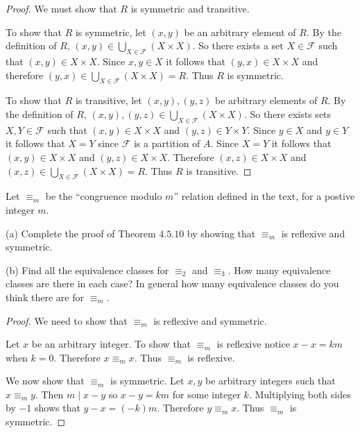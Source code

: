\begin{proof}
    We must show that $R$ is symmetric and transitive.

    To show that $R$ is symmetric, let $(x, y)$ be 
        an arbitrary element of $R$.
    By the definition of $R$, $(x, y) \in \bigcup_{X \in \mathcal{F}} (X \times X)$.
    So there exists a set $X \in \mathcal{F}$ such that $(x, y) \in X \times X$.
    Since $x, y \in X$ it follows that $(y, x) \in X \times X$ 
        and therefore $(y, x) \in \bigcup_{X \in \mathcal{F}} (X \times X) = R$.
    Thus $R$ is symmetric.

    To show that $R$ is transitive, let $(x, y), (y, z)$ be 
        arbitrary elements of $R$.
    By the definition of $R$, $(x, y), (y, z) \in \bigcup_{X \in \mathcal{F}} (X \times X)$.
    So there exists sets $X, Y \in \mathcal{F}$ such that $(x, y) \in X \times X$ and $(y, z) \in Y \times Y$.
    Since $y \in X$ and $y \in Y$ it follows that $X = Y$ since $\mathcal{F}$ is a partition of $A$.
    Since $X = Y$ it follows that $(x, y) \in X \times X$ and $(y, z) \in X \times X$.
    Therefore $(x, z) \in X \times X$ and $(x, z) \in \bigcup_{X \in \mathcal{F}} (X \times X) = R$.
    Thus $R$ is transitive.
\end{proof}

\begin{tcolorbox}[title=Problem 11, breakable]
    Let $\equiv_m$ be the ``congruence modulo $m$'' relation defined in the text,
        for a postive integer $m$.

    (a) Complete the proof of Theorem $4.5.10$ by showing that $\equiv_m$ is 
        reflexive and symmetric.
    
    (b) Find all the equivalence classes for $\equiv_2$ and $\equiv_3$.
        How many equivalence classes are there in each case?
        In general how many equivalence classes do you think there are 
        for $\equiv_m$.
\end{tcolorbox}

\begin{proof}
    We need to show that $\equiv_m$ is reflexive and symmetric.

    Let $x$ be an arbitrary integer.
    To show that $\equiv_m$ is reflexive notice $x - x = km$ when $k = 0$. 
    Therefore $x \equiv_m x$. Thus $\equiv_m$ is reflexive.

    We now show that $\equiv_m$ is symmetric.
    Let $x, y$ be arbitrary integers such that $x \equiv_m y$.
    Then $m \mid x - y $ so $x - y = km$ for some integer $k$.
    Multiplying both sides by $-1$ shows that $y - x = (-k)m$.
    Therefore $y \equiv_m x$. Thus $\equiv_m$ is symmetric.
\end{proof}

